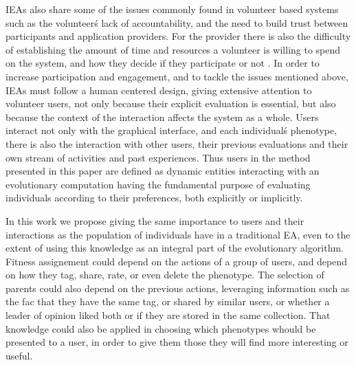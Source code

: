 \documentclass[conference]{IEEEtran}
\begin{document}
IEAs also share some of the issues commonly found in volunteer based systems
\cite{sarmenta2001volunteer,web:BOINC} such as the volunteer\'s lack of accountability,
and the need to build trust between participants and application providers. 
For the provider there is also the difficulty of establishing 
the amount of time and resources
a volunteer is willing to spend on the system, and how they decide if they
participate or not \cite{JJ:2016}. In order to increase participation and 
engagement, and to tackle the issues mentioned above,  
IEAs must follow a human centered design, %
giving extensive attention 
to volunteer users, not only because their
explicit evaluation is essential, but also because the context of the 
interaction affects the system as a whole. Users interact not only with the graphical
interface, and each individual\'s phenotype, there is also the interaction
with other users, their previous evaluations and their own stream of activities
and past experiences. Thus users in the method presented in this paper are defined as dynamic entities 
interacting with an evolutionary computation having the fundamental purpose 
of evaluating individuals according to their preferences,
both explicitly or implicitly. 

In this work we propose giving the same
importance to users and their interactions as the population of 
individuals have in a traditional EA, even to the extent of using this
knowledge as an integral part of the evolutionary algorithm. %
Fitness assignement could depend on the actions of a group of users, and depend on how
they tag, share, rate, or even delete the phenotype. The selection of parents could
also depend on the previous actions, leveraging information such as the fac that  they have the same tag, or shared by
similar users, or whether a leader of opinion liked both or if they are stored in the same collection.
That knowledge could also be applied in choosing which phenotypes whould be presented to a
user, in order to give them those they will find more interesting or useful. 
\end{document}

